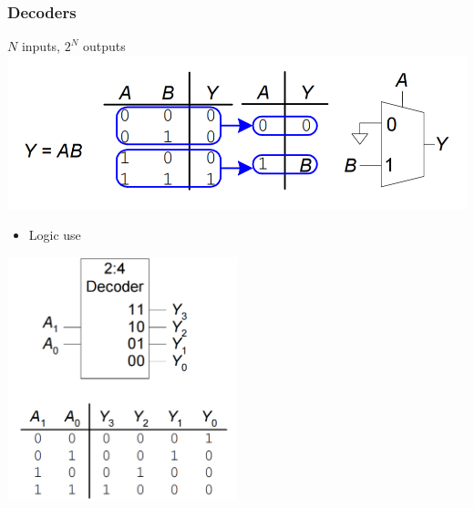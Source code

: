 \documentclass[12pt]{article}
\begin{document}
\subsubsection{Decoders}
$N$ inputs, $2^N$ outputs
\newline
\includegraphics[width=\textwidth]{Decoder.png}
\begin{itemize}
    \item Logic use
\end{itemize}
\includegraphics[width=0.5\textwidth]{LogicDecoder.png}
\end{document}
